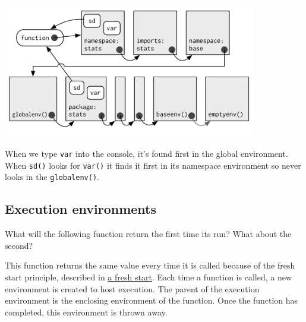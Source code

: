 \includegraphics[width=4.35in]{diagrams/environments.png/namespace.png}

When we type \texttt{var} into the console, it's found first in the
global environment. When \texttt{sd()} looks for \texttt{var()} it finds
it first in its namespace environment so never looks in the
\texttt{globalenv()}.

\subsection{Execution environments}

What will the following function return the first time its run? What
about the second? 

\begin{Shaded}
\begin{Highlighting}[]
\StringTok{ }
  \NormalTok{(}\NormalTok{, } \NormalTok{)) \{}
    \NormalTok{(}\NormalTok{)}
    \StringTok{ }
    \StringTok{ }\StringTok{ }
  \NormalTok{\}}
\NormalTok{\}}
\NormalTok{(}\NormalTok{)}
\NormalTok{(}\NormalTok{)}
\end{Highlighting}
\end{Shaded}

This function returns the same value every time it is called because of
the fresh start principle, described in \hyperref[fresh-start]{a fresh
start}. Each time a function is called, a new environment is created to
host execution. The parent of the execution environment is the enclosing
environment of the function. Once the function has completed, this
environment is thrown away.

